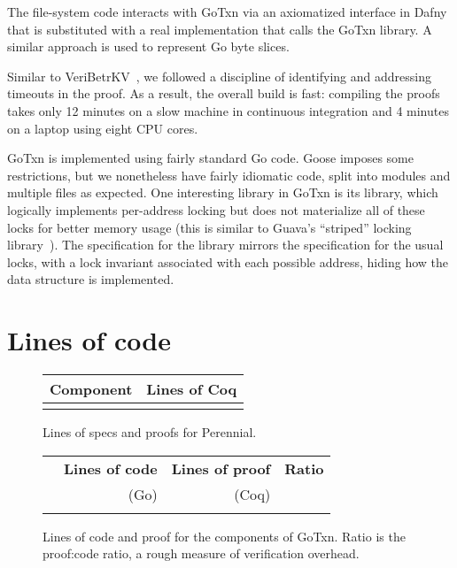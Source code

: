 The file-system code interacts with GoTxn via an axiomatized interface in Dafny
that is substituted with a real implementation that calls the GoTxn library. A
similar approach is used to represent Go byte slices.

Similar to VeriBetrKV~\cite{hance:veribetrkv}, we followed a
discipline of identifying and addressing timeouts in the proof.
As a result, the overall
build is fast: compiling the proofs takes only 12 minutes on a slow
machine in continuous integration and 4 minutes on a laptop
using eight CPU cores.


GoTxn is implemented using fairly standard Go code. Goose imposes some
restrictions, but we nonetheless have fairly idiomatic code, split into modules
and multiple files as expected. One interesting library in GoTxn is its
 library, which logically implements per-address locking but does
not materialize all of these locks for better memory usage (this is similar to
Guava's ``striped'' locking library~\cite{guava-striped}). The specification for
the library mirrors the specification for the usual locks, with a lock invariant
associated with each possible address, hiding how the data structure is
implemented.

\section{Lines of code}

\begin{figure}
\centering
\small
\begin{tabular}{lr}
\toprule
\bf Component & \bf Lines of Coq \\
\midrule
   \\
  \bottomrule
\end{tabular}
\caption{Lines of specs and proofs for Perennial.}
\label{fig:perennial:lines}
\end{figure}

\begin{figure}
\centering
\begin{tabular}{lrrr}
\toprule
  & \bf Lines of code & \bf Lines of proof & \bf Ratio \\
  & (Go) & (Coq) & \\
\midrule
   \\
\bottomrule
\end{tabular}
\caption{Lines of code and proof for the components of GoTxn.
Ratio is the proof:code ratio, a rough measure of verification overhead.}
\label{fig:txn:loc}
\end{figure}


